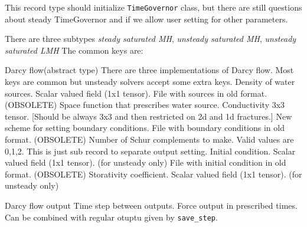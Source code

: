 This record type should initialize \verb'TimeGovernor' class, but there are still questions about steady TimeGovernor and 
if we allow user setting for other parameters.

There are three subtypes {\it steady saturated MH}, {\it unsteady saturated MH}, {\it unsteady saturated LMH}
The common keys are:

\begin{recordtype}{Darcy flow}{(abstract type)}
  There are three implementations of Darcy flow. Most keys are common but unsteady solvers accept some extra keys.
 Density of water sources. Scalar valued field (1x1 tensor).
File with sources in old format. (OBSOLETE)
 Space function that prescribes water source.
%
Conductivity 3x3 tensor. [Should be always 3x3 and then restricted on 2d and 1d fractures.]
New scheme for setting boundary conditions.
File with boundary conditions in old format. (OBSOLETE)
%
Number of Schur complements to make. Valid values are 0,1,2.
%
This is just sub record to separate output setting. 
%
Initial condition. Scalar valued field (1x1 tensor). (for unsteady only)
File with initial condition in old format. (OBSOLETE)
%
Storativity coefficient. Scalar valued field (1x1 tensor). (for unsteady only)
\end{recordtype}

\begin{recordtype}{Darcy flow output}{}
Time step between outputs.
Force output in prescribed times. Can be combined with regular otuptu given by \verb'save_step'.
\end{recordtype}
 


